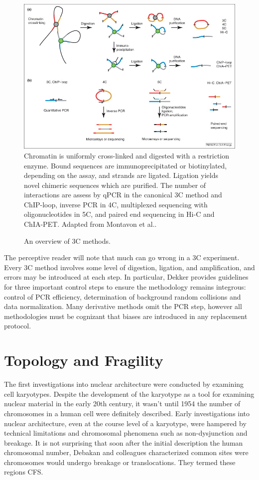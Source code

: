 \begin{figure}[b]
  \centering
  \caption{An overview of \gls{3C} methods.}
  \includegraphics[width=\textwidth]{fig/CompareChromosomeCapture}\label{fig:capturemethods}
  \medskip
  \small
  Chromatin is uniformly cross-linked and digested with a restriction enzyme.
  Bound sequences are immunoprecipitated or biotinylated, depending on the
  assay, and strands are ligated.  Ligation yields novel chimeric sequences
  which are purified.  The number of interactions are assess by qPCR in
  the canonical \gls{3C} method and ChIP-loop, inverse PCR in 4C, multiplexed
  sequencing with oligonucleotides in 5C, and paired end sequencing in Hi-C
  and ChIA-PET\@.  Adapted from Montavon et al.\cite{montavon2012}.
\end{figure}


The perceptive reader will note that much can go wrong in a \gls{3C} experiment. Every \gls{3C} method involves some level of digestion, ligation,
and amplification, and errors may be introduced at each step.  In particular, Dekker provides guidelines for three important control steps to
ensure the methodology remains integrous: control of PCR efficiency, determination of background random collisions and data
normalization\cite{dekker2006}.  Many derivative methods omit the PCR step, however all methodologies must be cognizant that
biases are introduced in any replacement protocol.

\section*{Topology and Fragility}

The first investigations into nuclear architecture were conducted by examining cell karyotypes.  Despite the development of the karyotype as a
tool for examining nuclear material in the early 20th century\cite{levitsky1924}, it wasn't until 1954 the number of chromosomes in a human
cell were definitely described\cite{tjio1956}.  Early investigations into nuclear architecture, even at the course level of a karyotype, were
hampered by technical limitations and chromosomal phenomena such as non-dysjunction and breakage.  It is not surprising that soon after the
initial description the human chromosomal number, Debakan and colleagues characterized common sites were chromosomes would undergo breakage or
translocations.  They termed these regions \gls{CFS}\cite{leyden2008}.

